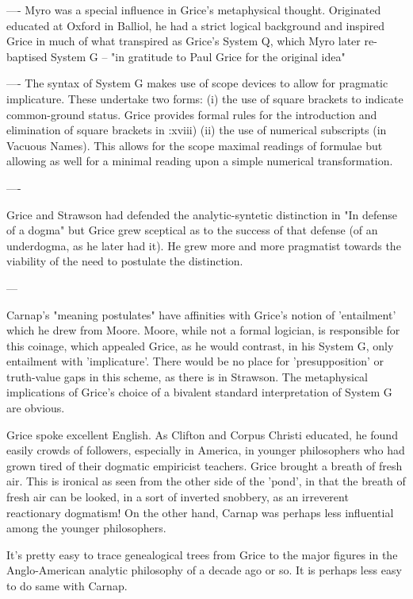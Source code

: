 \documentclass[10pt,titlepage]{book}
\begin{document}
{---- Myro was a special influence in Grice's metaphysical thought.  
Originated educated at Oxford in Balliol, he had a strict logical background and  
inspired Grice in much of what transpired as Grice's System Q, which Myro 
later  re-baptised System G -- "in gratitude to Paul Grice for the original 
idea"
 
---- The syntax of System G makes use of scope devices to allow for  
pragmatic implicature. These undertake two forms:
(i) the use of square brackets to indicate common-ground status. Grice  
provides formal rules for the introduction and elimination of square brackets 
in  \cite{grice89}:xviii)
(ii) the use of numerical subscripts (in Vacuous Names). This allows for  
the scope maximal readings of formulae but allowing as well for a minimal  
reading upon a simple numerical transformation. 
 
----
 
Grice and Strawson had defended the analytic-syntetic distinction in "In  
defense of a dogma" but Grice grew sceptical as to the success of that 
defense  (of an underdogma, as he later had it). He grew more and more pragmatist 
towards  the viability of the need to postulate the distinction.
 
---
 
Carnap's "meaning postulates" have affinities with Grice's notion of  
'entailment' which he drew from Moore. Moore, while not a formal logician, is  
responsible for this coinage, which appealed Grice, as he would contrast, in 
his  System G, only entailment with 'implicature'. There would be no place 
for  'presupposition' or truth-value gaps in this scheme, as there is in 
Strawson.  The metaphysical implications of Grice's choice of a bivalent standard 
 interpretation of System G are obvious.
 
Grice spoke excellent English. As Clifton and Corpus Christi educated, he  
found easily crowds of followers, especially in America, in younger 
philosophers  who had grown tired of their dogmatic empiricist teachers. Grice 
brought a  breath of fresh air. This is ironical as seen from the other side of 
the 'pond',  in that the breath of fresh air can be looked, in a sort of 
inverted snobbery,  as an irreverent reactionary dogmatism!  On the other hand, 
Carnap was  perhaps less influential among the younger philosophers. 
 
It's pretty easy to trace genealogical trees from Grice to the major  
figures in the Anglo-American analytic philosophy of a decade ago or so. It is  
perhaps less easy to do same with Carnap.
 
}
\end{document}
